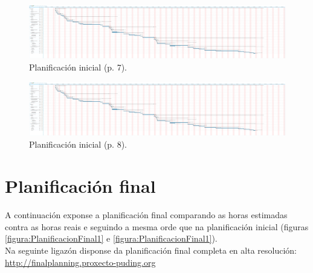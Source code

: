 \begin{figure}
 \centering
 \includegraphics[trim=189cm 5cm 21cm 0,clip=true,scale=0.45,keepaspectratio=true]{./imagenes/planificacion-inicial.png}
 \caption{Planificación inicial (p. 7).}
 \label{figura:PlanificacionInicialCompleta7}
\end{figure}

\begin{figure}
 \centering
 \includegraphics[trim=221cm 5cm 0 0,clip=true,scale=0.45,keepaspectratio=true]{./imagenes/planificacion-inicial.png}
 \caption{Planificación inicial (p. 8).}
 \label{figura:PlanificacionInicialCompleta8}
\end{figure}

\section{Planificación final}

A continuación exponse a planificación final comparando as horas estimadas
contra as horas reais e seguindo a mesma orde que na planificación inicial
(figuras \ref{figura:PlanificacionFinal1} e \ref{figura:PlanificacionFinal1}). \\

Na seguinte ligazón disponse da planificación final completa en alta
resolución: \\

\url{http://finalplanning.proxecto-puding.org} \\

